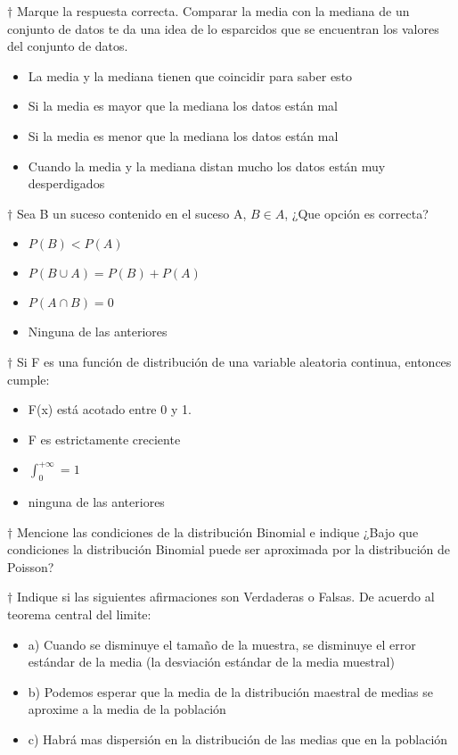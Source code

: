 \documentclass[10pt,a4paper]{article}
\begin{document}
$\dagger$  Marque la respuesta correcta. Comparar la media con la mediana de un conjunto de datos te da una idea de lo esparcidos que se encuentran los valores del conjunto de datos.
\begin{itemize}
	\item La media y la mediana tienen que coincidir para saber esto
	\item Si la media es mayor que la mediana los datos están mal
	\item Si la media es menor que la mediana los datos están mal
	\item Cuando la media y la mediana distan mucho los datos están muy desperdigados
\end{itemize}

$\dagger$  Sea B un suceso contenido en el suceso A, $B\in A$, ¿Que opción es correcta?
\begin{itemize}
	\item $P(B)<P(A)$
	\item $P(B\cup A)=P(B)+P(A)$
	\item $P(A\cap B)=0$
	\item Ninguna de las anteriores
\end{itemize}

$\dagger$  Si F es una función de distribución de una variable aleatoria continua, entonces cumple:
\begin{itemize}
	\item F(x) está acotado entre 0 y 1.
	\item F es estrictamente creciente
	\item $\int_{0}^{+\infty}=1$
	\item ninguna de las anteriores
\end{itemize}

$\dagger$  Mencione las condiciones de la distribución Binomial e indique ¿Bajo que condiciones la distribución Binomial puede ser aproximada por la distribución de Poisson?

$\dagger$  Indique si las siguientes afirmaciones son Verdaderas o Falsas. De acuerdo al teorema central del limite:
\begin{itemize}
	\item a) Cuando se disminuye el tamaño de la muestra, se disminuye el error estándar de la media (la desviación estándar de la media muestral)
	\item b) Podemos esperar que la media de la distribución maestral de medias se aproxime a la media de la población
	\item c) Habrá mas dispersión en la distribución de las medias que en la población
\end{itemize}
\end{document}
